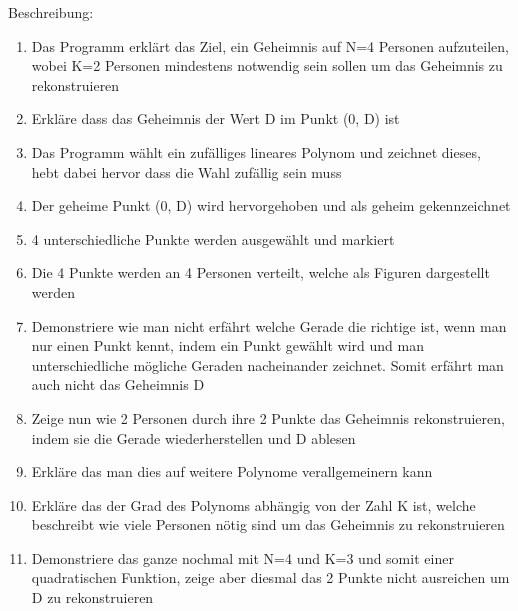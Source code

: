 \documentclass{article}
\begin{document}
Beschreibung:
\begin{enumerate}
    \item Das Programm erklärt das Ziel,
        ein Geheimnis auf N=4 Personen aufzuteilen,
        wobei K=2 Personen mindestens notwendig sein sollen um
        das Geheimnis zu rekonstruieren
    \item Erkläre dass das Geheimnis der Wert
        D im Punkt (0, D) ist
    \item Das Programm wählt ein zufälliges lineares Polynom
        und zeichnet dieses, hebt dabei hervor dass die Wahl
        zufällig sein muss
    \item Der geheime Punkt (0, D)
        wird hervorgehoben
        und als geheim gekennzeichnet
    \item 4 unterschiedliche Punkte werden ausgewählt
        und markiert
    \item Die 4 Punkte werden an 4 Personen
        verteilt, welche als Figuren dargestellt
        werden
    \item Demonstriere wie man nicht erfährt
        welche Gerade die richtige ist, wenn
        man nur einen Punkt kennt, indem
        ein Punkt gewählt wird und man
        unterschiedliche mögliche Geraden
        nacheinander zeichnet.
        Somit erfährt man auch nicht
        das Geheimnis D
    \item Zeige nun wie 2 Personen
        durch ihre 2 Punkte das Geheimnis rekonstruieren,
        indem sie die Gerade wiederherstellen und D ablesen
    \item Erkläre das man dies auf weitere Polynome
        verallgemeinern kann
    \item Erkläre das der Grad des Polynoms
        abhängig von der Zahl K ist, welche
        beschreibt wie viele Personen nötig
        sind um das Geheimnis zu rekonstruieren
    \item Demonstriere das ganze nochmal mit N=4
        und K=3 und somit einer quadratischen Funktion,
        zeige aber diesmal das 2 Punkte nicht ausreichen
        um D zu rekonstruieren
\end{enumerate}
\end{document}
